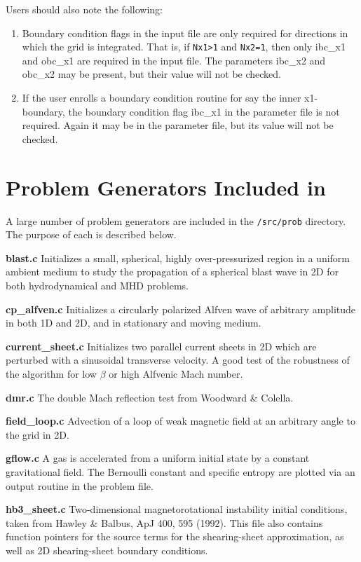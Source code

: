 Users should also note the following:

\begin{enumerate}
\item Boundary condition flags in the input file are only required for 
directions in which the grid is integrated.  That is, if {\tt Nx1>1}
and {\tt Nx2=1}, then only ibc\_x1 and obc\_x1 are required in the
input file.  The parameters ibc\_x2 and obc\_x2 may be present, but
their value will not be checked.
\item If the user enrolls a boundary condition routine for say the inner
x1-boundary, the boundary condition flag ibc\_x1 in the parameter file
is not required.  Again it may be in the parameter file, but its value
will not be checked.
\end{enumerate}

\section{Problem Generators Included in \ath}

A large number of problem generators are included in the {\tt /src/prob}
directory.  The purpose of each is described below.

\bigskip
\noindent
{\bf blast.c}
Initializes a small, spherical, highly over-pressurized region in
a uniform ambient medium to study the propagation of a spherical
blast wave in 2D for both hydrodynamical and MHD problems.


\bigskip
\noindent
{\bf cp\_alfven.c}
Initializes a circularly polarized Alfven wave of arbitrary amplitude in
both 1D and 2D, and in stationary and moving medium.

\bigskip
\noindent
{\bf current\_sheet.c}
Initializes two parallel current sheets in 2D which are perturbed with a
sinusoidal transverse velocity.  A good test of the robustness of the
algorithm for low $\beta$ or high Alfvenic Mach number.

\bigskip
\noindent
{\bf dmr.c}
The double Mach reflection test from Woodward \& Colella.

\bigskip
\noindent
{\bf field\_loop.c}
Advection of a loop of weak magnetic field at an arbitrary angle to the
grid in 2D.

\bigskip
\noindent
{\bf gflow.c}
A gas is accelerated from a uniform initial state by a constant
gravitational field.  The Bernoulli constant and specific entropy are
plotted via an output routine in the problem file.

\bigskip
\noindent
{\bf hb3\_sheet.c}
Two-dimensional magnetorotational instability initial conditions, taken
from Hawley \& Balbus, ApJ 400, 595 (1992).  This file also contains
function pointers for the source terms for the shearing-sheet approximation,
as well as 2D shearing-sheet boundary conditions.

